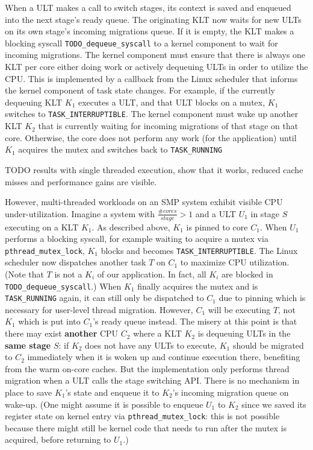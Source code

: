 \documentclass[12pt,a4paper]{book}
\begin{document}
When a ULT makes a call to switch stages, its context is saved and enqueued into the next stage's ready queue.
The originating KLT now waits for new ULTs on its own stage's incoming migrations queue.
If it is empty, the KLT makes a blocking syscall \texttt{TODO\_dequeue\_syscall} to a kernel component to wait for incoming migrations.
The kernel component must ensure that there is always one KLT per core either doing work or actively dequeuing ULTs in order to utilize the CPU.
This is implemented by a callback from the Linux scheduler that informs the kernel component of task state changes.
For example, if the currently dequeuing KLT $K_1$ executes a ULT, and that ULT blocks on a mutex, $K_1$ switches to \texttt{TASK\_INTERRUPTIBLE}.
The kernel component must wake up another KLT $K_2$ that is currently waiting for incoming migrations of that stage on that core.
Otherwise, the core does not perform any work (for the application) until $K_1$ acquires the mutex and switches back to \texttt{TASK\_RUNNING}

TODO results with single threaded execution, show that it works, reduced cache misses and performance gains are visible.

However, multi-threaded workloads on an SMP system exhibit visible CPU under-utilization.
Imagine a system with $\frac{\#cores}{stage} > 1$ and a ULT $U_1$ in stage $S$ executing on a KLT $K_1$.
As described above, $K_1$ is pinned to core $C_1$.
When $U_1$ performs a blocking syscall, for example waiting to acquire a mutex via \texttt{pthread\_mutex\_lock}, $K_1$ blocks and becomes \texttt{TASK\_INTERRUPTIBLE}.
The Linux scheduler now dispatches another task $T$ on $C_1$ to maximize CPU utilization.
(Note that $T$ is not a $K_i$ of our application. In fact, all $K_i$ are blocked in \texttt{TODO\_dequeue\_syscall}.)
When $K_1$ finally acquires the mutex and is \texttt{TASK\_RUNNING} again, it can still only be dispatched to $C_1$ due to pinning which is necessary for user-level thread migration.
However, $C_1$ will be executing $T$, not $K_1$ which is put into $C_1$'s ready queue instead.
The misery at this point is that there may exist \textbf{another} CPU $C_2$ where a KLT $K_2$ is dequeuing ULTs in the \textbf{same stage} $S$:
if $K_2$ does not have any ULTs to execute, $K_1$ should be migrated to $C_2$ immediately when it is woken up and continue execution there, benefiting from the warm on-core caches.
But the implementation only performs thread migration when a ULT calls the stage switching API.
There is no mechanism in place to save $K_1$'s state and enqueue it to $K_2$'s incoming migration queue on wake-up.
(One might assume it is possible to enqueue $U_1$ to $K_2$ since we saved its register state on kernel entry via \texttt{pthread\_mutex\_lock}:
this is not possible because there might still be kernel code that needs to run after the mutex is acquired, before returning to $U_1$.)
\end{document}
